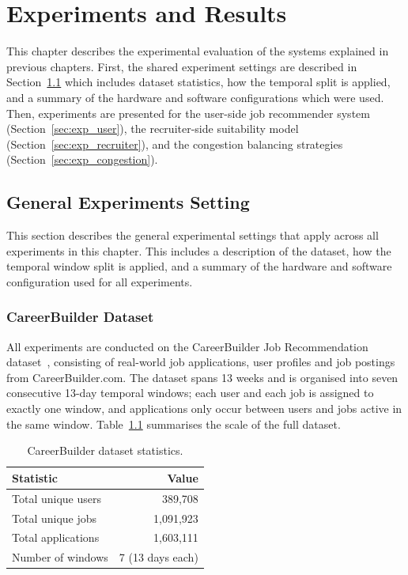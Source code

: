 \chapter{Experiments and Results}
\label{chap:experiments}
This chapter describes the experimental evaluation of the systems explained in previous chapters. First, the shared experiment settings are described in Section~\ref{sec:exp_settings} which includes dataset statistics, how the temporal split is applied, and a summary of the hardware and software configurations which were used. Then, experiments are presented for the user-side job recommender system (Section~\ref{sec:exp_user}), the recruiter-side suitability model (Section~\ref{sec:exp_recruiter}), and the congestion balancing strategies (Section~\ref{sec:exp_congestion}).

\section{General Experiments Setting}
\label{sec:exp_settings}
This section describes the general experimental settings that apply across all experiments in this chapter. This includes a description of the dataset, how the temporal window split is applied, and a summary of the hardware and software configuration used for all experiments. 
\subsection{CareerBuilder Dataset}
\label{sec:exp_dataset}

All experiments are conducted on the CareerBuilder Job Recommendation 
dataset~\cite{careerbuilderdataset}, consisting of real-world job 
applications, user profiles and job postings from CareerBuilder.com. 
The dataset spans 13 weeks and is organised into seven consecutive 
13-day temporal windows; each user and each job is assigned to exactly 
one window, and applications only occur between users and jobs active 
in the same window. Table~\ref{tab:dataset_stats} summarises the scale 
of the full dataset.

\begin{table}[htbp]
    \centering
    \caption{CareerBuilder dataset statistics.}
    \label{tab:dataset_stats}
    \begin{tabular}{lr}
        \toprule
        \textbf{Statistic} & \textbf{Value} \\
        \midrule
        Total unique users       & 389,708 \\
        Total unique jobs        & 1,091,923 \\
        Total applications       & 1,603,111 \\
        Number of windows        & 7 (13 days each) \\
        \bottomrule
    \end{tabular}
\end{table}

